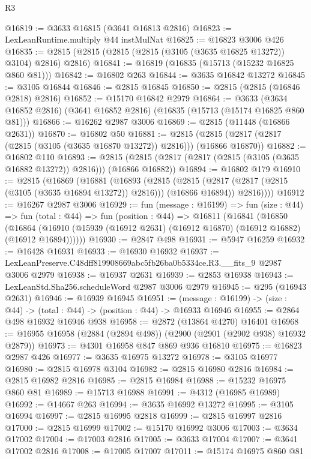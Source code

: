 \begin{lexlean}{R3}
\begin{coremodule}
@16819 := @3633 @16815 (@3641 @16813 @2816)
@16823 := LexLeanRuntime.multiply @44 instMulNat
@16825 := @16823 @3006 @426
@16835 := @2815 (@2815 (@2815 (@2815 (@3105 (@3635 @16825 @13272)) @3104) @2816) @2816)
@16841 := @16819 (@16835 (@15713 (@15232 @16825 @860 @81)))
@16842 := @16802 @263
@16844 := @3635 @16842 @13272
@16845 := @3105 @16844
@16846 := @2815 @16845
@16850 := @2815 (@2815 (@16846 @2818) @2816)
@16852 := @15170 @16842 @2979
@16864 := @3633 (@3634 @16852 @2816) (@3641 @16852 @2816) (@16835 (@15713 (@15174 @16825 @860 @81)))
@16866 := @16262 @2987 @3006
@16869 := @2815 (@11448 (@16866 @2631))
@16870 := @16802 @50
@16881 := @2815 (@2815 (@2817 (@2817 (@2815 (@3105 (@3635 @16870 @13272)) @2816))) (@16866 @16870))
@16882 := @16802 @110
@16893 := @2815 (@2815 (@2817 (@2817 (@2815 (@3105 (@3635 @16882 @13272)) @2816))) (@16866 @16882))
@16894 := @16802 @179
@16910 := @2815
    (@16869
      (@16881
        (@16893
          (@2815
            (@2815 (@2817 (@2817 (@2815 (@3105 (@3635 @16894 @13272)) @2816))) (@16866 @16894))
            @2816))))
@16912 := @16267 @2987 @3006
@16929 := fun (message : @16199) =>
  fun (size : @44) =>
  fun (total : @44) =>
  fun (position : @44) =>
  @16811
    (@16841
      (@16850
        (@16864 (@16910 (@15939 (@16912 @2631) (@16912 @16870) (@16912 @16882) (@16912 @16894))))))
@16930 := @2847 @498
@16931 := @5947 @16259
@16932 := @16428 @16931
@16933 := @16930 @16932
@16937 := LexLeanPreserve.C48dff819908669abc5fb26ba0b5334ce.R3.__fits_9 @2987 @3006 @2979
@16938 := @16937 @2631
@16939 := @2853 @16938
@16943 := LexLeanStd.Sha256.scheduleWord @2987 @3006 @2979
@16945 := @295 (@16943 @2631)
@16946 := @16939 @16945
@16951 := (message : @16199) -> (size : @44) -> (total : @44) -> (position : @44) -> @16933 @16946
@16955 := @2864 @498 @16932 @16946 @938
@16958 := @2872 (@13864 @4270) @16401
@16968 := @16955 @16958 (@2884 (@2894 @498)) (@2900 (@2901 (@2902 @938) @16932 @2879))
@16973 := @4301 @16958 @847 @869 @936 @16810
@16975 := @16823 @2987 @426
@16977 := @3635 @16975 @13272
@16978 := @3105 @16977
@16980 := @2815 @16978 @3104
@16982 := @2815 @16980 @2816
@16984 := @2815 @16982 @2816
@16985 := @2815 @16984
@16988 := @15232 @16975 @860 @81
@16989 := @15713 @16988
@16991 := @4312 (@16985 @16989)
@16992 := @14667 @263
@16994 := @3635 @16992 @13272
@16995 := @3105 @16994
@16997 := @2815 @16995 @2818
@16999 := @2815 @16997 @2816
@17000 := @2815 @16999
@17002 := @15170 @16992 @3006
@17003 := @3634 @17002
@17004 := @17003 @2816
@17005 := @3633 @17004
@17007 := @3641 @17002 @2816
@17008 := @17005 @17007
@17011 := @15174 @16975 @860 @81

\end{coremodule}
\end{lexlean}
